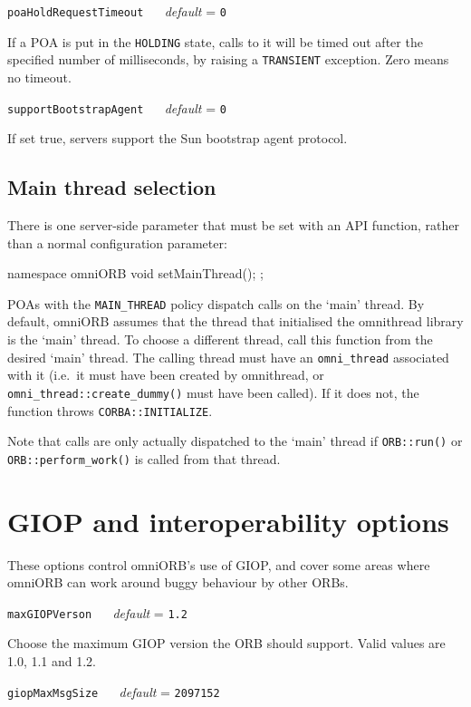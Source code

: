 \documentclass[11pt,twoside,a4paper]{book}
\makeatletter
\newcommand{\code}[1]{\texttt{#1}}
\newcommand{\op}[1]{\texttt{#1()}}
\newcommand{\confopt}[2]
  {\vspace{\baselineskip}\par\noindent\code{#1} ~~ \textit{default} =
   \code{#2}}
\renewcommand{\confopt}[2]
  {\vspace{\baselineskip}\par\noindent\code{#1} ~~ \textit{default} =
   \code{#2}\\[-1ex]\@afterheading}
\newcommand{\dsc}{\discretionary{}{}{}}
\makeatother
\begin{document}
\confopt{poaHoldRequestTimeout}{0}

If a POA is put in the \code{HOLDING} state, calls to it will be timed
out after the specified number of milliseconds, by raising a
\code{TRANSIENT} exception. Zero means no timeout.


\confopt{supportBootstrapAgent}{0}

If set true, servers support the Sun bootstrap agent protocol.


\subsection{Main thread selection}

There is one server-side parameter that must be set with an API
function, rather than a normal configuration parameter:

\begin{cxxlisting}
namespace omniORB {
  void setMainThread();
};
\end{cxxlisting}

\noindent
POAs with the \code{MAIN\_THREAD} policy dispatch calls on the `main'
thread.  By default, omniORB assumes that the thread that initialised
the omnithread library is the `main' thread. To choose a different
thread, call this function from the desired `main' thread. The calling
thread must have an \code{omni\_thread} associated with it (i.e.\ it
must have been created by omnithread, or
\op{omni\_thread::create\_\dsc{}dummy} must have been called). If it
does not, the function throws \code{CORBA::\dsc{}INITIALIZE}.
                                                                  
Note that calls are only actually dispatched to the `main' thread if
\op{ORB::run} or \op{ORB::perform\_work} is called from that thread.




\section{GIOP and interoperability options}

These options control omniORB's use of GIOP, and cover some areas
where omniORB can work around buggy behaviour by other ORBs.


\confopt{maxGIOPVerson}{1.2}

Choose the maximum GIOP version the ORB should support. Valid values
are 1.0, 1.1 and 1.2.


\confopt{giopMaxMsgSize}{2097152}
\end{document}
